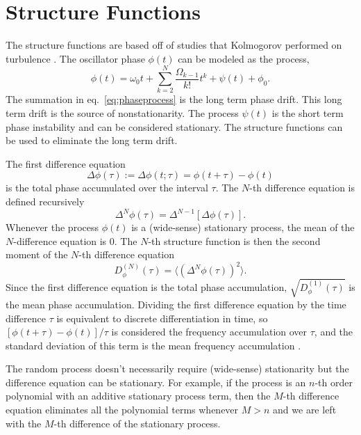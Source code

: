 \section{Structure Functions} \label{sec:structure}

The structure functions are based off of studies that Kolmogorov performed on turbulence \cite{Lindsey1976}. The oscillator phase $\phi(t)$ can be modeled as the process,
%
\begin{equation} \label{eq:phaseprocess}
\phi(t) = \omega_0t + \sum_{k=2}^{N} \frac{\Omega_{k-1}}{k!}t^k + \psi(t) + \phi_0.
\end{equation}
%
The summation in eq.~\ref{eq:phaseprocess} is the long term phase drift. This long term drift is the source of nonstationarity. The process $\psi(t)$ is the short term phase instability and can be considered stationary. The structure functions can be used to eliminate the long term drift. 

The first difference equation
%
\begin{equation}
\Delta\phi(\tau) := \Delta\phi(t;\tau) = \phi(t+\tau) - \phi(t)
\end{equation}
%
is the total phase accumulated over the interval $\tau$. The $N$-th difference equation is defined recursively
%
\begin{equation}
\Delta^N\phi(\tau) = \Delta^{N-1}\left[\Delta\phi(\tau)\right].
\end{equation}
%
Whenever the process $\phi(t)$ is a (wide-sense) stationary process, the mean of the $N$-difference equation is $0$. The $N$-th structure function is then the second moment of the $N$-th difference equation
\begin{equation}
D_\phi^{(N)}(\tau) = \langle (\Delta^N\phi(\tau))^2 \rangle.
\end{equation}
%
Since the first difference equation is the total phase accumulation, $\sqrt{D_\phi^{(1)}(\tau)}$ is the mean phase accumulation. Dividing the first difference equation by the time difference $\tau$ is equivalent to discrete differentiation in time, so $[\phi(t+\tau) - \phi(t)]/\tau$ is considered the frequency accumulation over $\tau$, and the standard deviation of this term is the mean frequency accumulation \cite{Lindsey1976}.

The random process doesn't necessarily require (wide-sense) stationarity but the difference equation can be stationary. For example, if the process is an $n$-th order polynomial with an additive stationary process term, then the $M$-th difference equation eliminates all the polynomial terms whenever $M > n$ and we are left with the $M$-th difference of the stationary process. 

